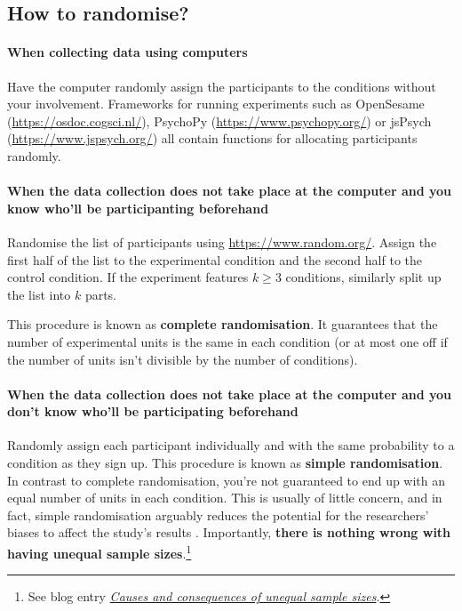 \documentclass[a4paper]{tufte-book}\usepackage[]{graphicx}\usepackage[]{xcolor}
\begin{document}
\subsection{How to randomise?}

\paragraph{When collecting data using computers}
Have the computer randomly assign the
participants to the conditions
without your involvement. 
Frameworks for running experiments such as OpenSesame 
(\url{https://osdoc.cogsci.nl/}),
PsychoPy (\url{https://www.psychopy.org/})
or jsPsych (\url{https://www.jspsych.org/}) 
all contain functions for allocating participants randomly.

\paragraph{When the data collection does not take place
at the computer and you know who'll be participanting
beforehand}
Randomise the list of participants using \url{https://www.random.org/}.
Assign the first half of the list to the experimental condition
and the second half to the control condition.
If the experiment features $k \geq 3$ conditions,
similarly split up the list into $k$ parts.

This procedure is known as \textbf{complete randomisation}.
It guarantees that the number of experimental units is the same
in each condition (or at most one off if the number of units isn't
divisible by the number of conditions).

\paragraph{When the data collection does not take place
at the computer and you don't know who'll be participating
beforehand}
Randomly assign each participant individually
and with the same probability to a condition as they sign up.
This procedure is known as \textbf{simple randomisation}.
In contrast to complete randomisation, you're not guaranteed to end up
with an equal number of units in each condition. This is usually of little
concern, and in fact, simple randomisation arguably reduces the potential
for the researchers' biases to affect the study's results \citep{Kahan2015}.
Importantly, \textbf{there is nothing wrong with having unequal sample sizes}.\footnote{See blog entry \href{https://janhove.github.io/posts/2015-11-02-unequal-sample-sized/}{\textit{Causes and consequences of unequal sample sizes}}.}
\end{document}
